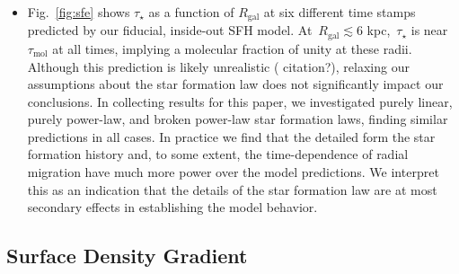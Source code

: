 \documentclass[fleqn, usenatbib]{mnras}
\begin{document}
\begin{itemize}
	\item Fig.~\ref{fig:sfe} shows $\tau_\star$ as a function of $R_\text{gal}$ 
	at six different time stamps predicted by our fiducial, inside-out SFH 
	model. At~$R_\text{gal} \lesssim$6 kpc,~$\tau_\star$ is near 
	$\tau_\text{mol}$ at all times, implying a molecular fraction of unity at 
	these radii. Although this prediction is likely unrealistic ({\color{red} 
	citation?}), relaxing our assumptions about the star formation law does not 
	significantly impact our conclusions. In collecting results for this paper, 
	we investigated purely linear, purely power-law, and broken power-law star 
	formation laws, finding similar predictions in all cases. In practice we 
	find that the detailed form the star formation history and, to some extent, 
	the time-dependence of radial migration have much more power over the model 
	predictions. We interpret this as an indication that the details of the 
	star formation law are at most secondary effects in establishing the model 
	behavior. 
\end{itemize} 

\subsection{Surface Density Gradient} 
\label{sec:methods:surface_density_gradient} 
\end{document}
